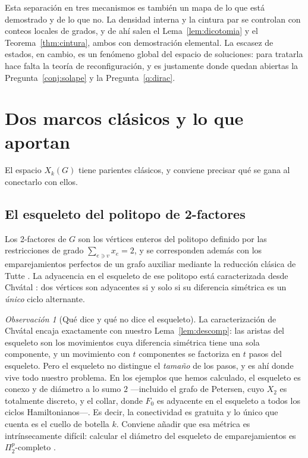 \documentclass[11pt,a4paper]{article}
\theoremstyle{definition}
\theoremstyle{remark}
\newtheorem{observacion}[teorema]{Observación}
\begin{document}
Esta separación en tres mecanismos es también un mapa de lo que está demostrado y de lo que no. La densidad interna y la cintura par se controlan con conteos locales de grados, y de ahí salen el Lema~\ref{lem:dicotomia} y el Teorema~\ref{thm:cintura}, ambos con demostración elemental. La escasez de estados, en cambio, es un fenómeno global del espacio de soluciones: para tratarla hace falta la teoría de reconfiguración, y es justamente donde quedan abiertas la Pregunta~\ref{conj:solape} y la Pregunta~\ref{q:dirac}.



\section{Dos marcos clásicos y lo que aportan}\label{sec:marcos}

El espacio $X_k(G)$ tiene parientes clásicos, y conviene precisar qué se gana al conectarlo con ellos.

\subsection{El esqueleto del politopo de 2-factores}

Los 2-factores de $G$ son los vértices enteros del politopo definido por las restricciones de grado $\sum_{e\ni v}x_e=2$, y se corresponden además con los emparejamientos perfectos de un grafo auxiliar mediante la reducción clásica de Tutte \cite{tutte54}. La adyacencia en el esqueleto de ese politopo está caracterizada desde Chvátal \cite{chvatal75}: dos vértices son adyacentes si y solo si su diferencia simétrica es un \emph{único} ciclo alternante.

\begin{observacion}[Qué dice y qué no dice el esqueleto]\label{obs:esqueleto}
La caracterización de Chvátal encaja exactamente con nuestro Lema~\ref{lem:descomp}: las aristas del esqueleto son los movimientos cuya diferencia simétrica tiene una sola componente, y un movimiento con $t$ componentes se factoriza en $t$ pasos del esqueleto. Pero el esqueleto no distingue el \emph{tamaño} de los pasos, y es ahí donde vive todo nuestro problema. En los ejemplos que hemos calculado, el esqueleto es conexo y de diámetro a lo sumo $2$ —incluido el grafo de Petersen, cuyo $X_2$ es totalmente discreto, y el collar, donde $F_0$ es adyacente en el esqueleto a todos los ciclos Hamiltonianos—. Es decir, la conectividad es gratuita y lo único que cuenta es el cuello de botella $k$. Conviene añadir que esa métrica es intrínsecamente difícil: calcular el diámetro del esqueleto de emparejamientos es $\Pi_2^p$-completo \cite{diameter25}.
\end{observacion}
\end{document}
